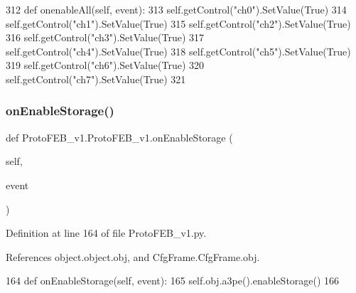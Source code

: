 \begin{DoxyCode}
312     \textcolor{keyword}{def }onenableAll(self, event):
313         self.getControl(\textcolor{stringliteral}{"ch0"}).SetValue(\textcolor{keyword}{True})
314         self.getControl(\textcolor{stringliteral}{"ch1"}).SetValue(\textcolor{keyword}{True})
315         self.getControl(\textcolor{stringliteral}{"ch2"}).SetValue(\textcolor{keyword}{True})
316         self.getControl(\textcolor{stringliteral}{"ch3"}).SetValue(\textcolor{keyword}{True})
317         self.getControl(\textcolor{stringliteral}{"ch4"}).SetValue(\textcolor{keyword}{True})
318         self.getControl(\textcolor{stringliteral}{"ch5"}).SetValue(\textcolor{keyword}{True})
319         self.getControl(\textcolor{stringliteral}{"ch6"}).SetValue(\textcolor{keyword}{True})
320         self.getControl(\textcolor{stringliteral}{"ch7"}).SetValue(\textcolor{keyword}{True})
321 
\end{DoxyCode}
\mbox{\label{classProtoFEB__v1_1_1ProtoFEB__v1_a014b9b6ed64493754e2c759c01564f21}} 
\subsubsection{\texorpdfstring{on\+Enable\+Storage()}{onEnableStorage()}}
{\footnotesize\ttfamily def Proto\+F\+E\+B\+\_\+v1.\+Proto\+F\+E\+B\+\_\+v1.\+on\+Enable\+Storage (\begin{DoxyParamCaption}\item[{}]{self,  }\item[{}]{event }\end{DoxyParamCaption})}



Definition at line 164 of file Proto\+F\+E\+B\+\_\+v1.\+py.



References object.\+object.\+obj, and Cfg\+Frame.\+Cfg\+Frame.\+obj.


\begin{DoxyCode}
164     \textcolor{keyword}{def }onEnableStorage(self, event):
165         self.obj.a3pe().enableStorage()
166 
\end{DoxyCode}
\mbox{\label{classProtoFEB__v1_1_1ProtoFEB__v1_a7abdc74a7edba3a8e7c3b4bc4a616664}} 
